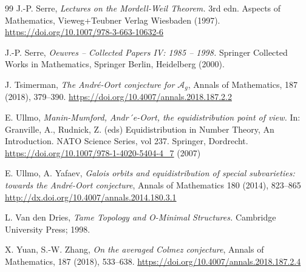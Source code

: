 \documentclass[12pt]{amsart}
\begin{document}
\begin{thebibliography}{99}
 J.-P. Serre, {\it Lectures on the Mordell-Weil Theorem.} 3rd edn. Aspects of Mathematics, Vieweg+Teubner Verlag Wiesbaden (1997). \url{https://doi.org/10.1007/978-3-663-10632-6}

 J.-P. Serre, {\it Oeuvres -- Collected Papers IV: 1985 -- 1998.} Springer Collected Works in Mathematics, Springer Berlin, Heidelberg (2000).


 J. Tsimerman, {\it The André-Oort conjecture for $\mathcal{A}_g$}, Annals of Mathematics, 187 (2018), 379–390. \url{https://doi.org/10.4007/annals.2018.187.2.2}

 E. Ullmo, {\it Manin-Mumford, Andr´e-Oort, the
equidistribution point of view.} In: Granville, A., Rudnick, Z. (eds) Equidistribution in Number Theory, An Introduction. NATO Science Series, vol 237. Springer, Dordrecht. \url{https://doi.org/10.1007/978-1-4020-5404-4_7} (2007)


 E. Ullmo, A. Yafaev, {\it Galois orbits and equidistribution
of special subvarieties: towards
the André-Oort conjecture},
Annals of Mathematics 180 (2014), 823–865
\url{http://dx.doi.org/10.4007/annals.2014.180.3.1}


 L. Van den Dries,  {\it Tame Topology and O-Minimal Structures.} Cambridge University Press; 1998.

 X. Yuan, S.-W. Zhang, {\it On the averaged Colmez conjecture}, Annals of Mathematics, 187 (2018), 533–638. \url{https://doi.org/10.4007/annals.2018.187.2.4}



\end{thebibliography}
\end{document}
